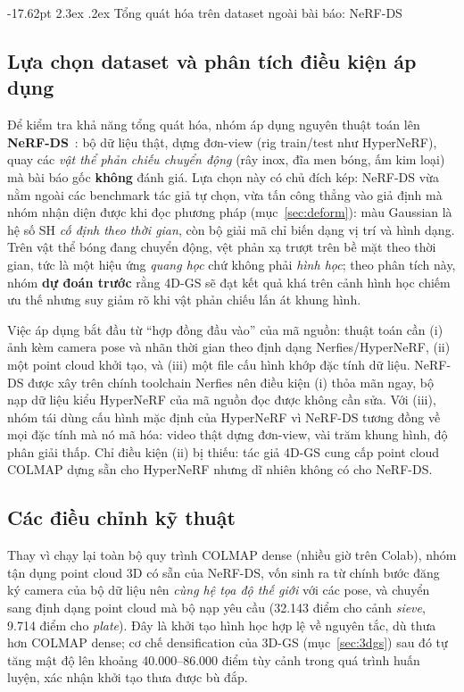 \documentclass[a4paper]{report}
\makeatletter
\renewcommand\section{\@startsection{section}{1}{\z@}%
    {-17.62pt \@plus -5.89pt \@minus -1.18pt}%
    {2.3ex \@plus .2ex}%
    {\normalfont\fontsize{14.95pt}{16.31pt}\selectfont\bfseries}}
\makeatother
\begin{document}
\section{Tổng quát hóa trên dataset ngoài bài báo: NeRF-DS}
\label{sec:nerfds}

\subsection*{Lựa chọn dataset và phân tích điều kiện áp dụng}

Để kiểm tra khả năng tổng quát hóa, nhóm áp dụng nguyên thuật toán lên
\textbf{NeRF-DS}~\cite{yan2023nerfds}: bộ dữ liệu thật, dựng đơn-view (rig train/test như HyperNeRF), quay các
\textit{vật thể phản chiếu chuyển động} (rây inox, đĩa men bóng, ấm kim loại)
mà bài báo gốc \textbf{không} đánh giá. Lựa chọn này có chủ đích kép: NeRF-DS
vừa nằm ngoài các benchmark tác giả tự chọn, vừa tấn công thẳng vào giả định mà
nhóm nhận diện được khi đọc phương pháp (mục~\ref{sec:deform}): màu Gaussian là hệ số SH
\textit{cố định theo thời gian}, còn bộ giải mã chỉ biến dạng vị trí và hình
dạng. Trên vật thể bóng đang chuyển động, vệt phản xạ trượt trên bề mặt theo
thời gian, tức là một hiệu ứng \textit{quang học} chứ không phải \textit{hình
học}; theo phân tích này, nhóm \textbf{dự đoán trước} rằng 4D-GS sẽ đạt kết quả
khá trên cảnh hình học chiếm ưu thế nhưng suy giảm rõ khi vật phản chiếu lấn át khung hình.

Việc áp dụng bắt đầu từ ``hợp đồng đầu vào'' của mã nguồn: thuật toán cần (i)
ảnh kèm camera pose và nhãn thời gian theo định dạng Nerfies/HyperNeRF, (ii)
một point cloud khởi tạo, và (iii) một file cấu hình khớp đặc tính dữ liệu.
NeRF-DS được xây trên chính toolchain Nerfies nên điều kiện (i) thỏa mãn ngay,
bộ nạp dữ liệu kiểu HyperNeRF của mã nguồn đọc được không cần sửa. Với (iii), nhóm
tái dùng cấu hình mặc định của HyperNeRF vì NeRF-DS tương đồng về mọi đặc tính mà
nó mã hóa: video thật dựng đơn-view, vài trăm khung hình, độ phân giải thấp. Chỉ điều kiện (ii) bị thiếu: tác giả 4D-GS cung cấp point
cloud COLMAP dựng sẵn cho HyperNeRF nhưng dĩ nhiên không có cho NeRF-DS.

\subsection*{Các điều chỉnh kỹ thuật}

Thay vì chạy lại toàn bộ quy trình COLMAP dense (nhiều giờ trên Colab), nhóm tận
dụng point cloud 3D có sẵn của NeRF-DS, vốn sinh ra từ chính bước đăng ký camera
của bộ dữ liệu nên \textit{cùng hệ tọa độ thế giới} với các pose, và chuyển sang
định dạng point cloud mà bộ nạp yêu cầu (32.143 điểm cho cảnh \textit{sieve},
9.714 điểm cho \textit{plate}). Đây là khởi tạo hình
học hợp lệ về nguyên tắc, dù thưa hơn COLMAP dense; cơ chế densification của
3D-GS (mục~\ref{sec:3dgs}) sau đó tự tăng mật độ lên khoảng 40.000--86.000 điểm tùy cảnh trong
quá trình huấn luyện, xác nhận khởi tạo thưa được bù đắp.
\end{document}
